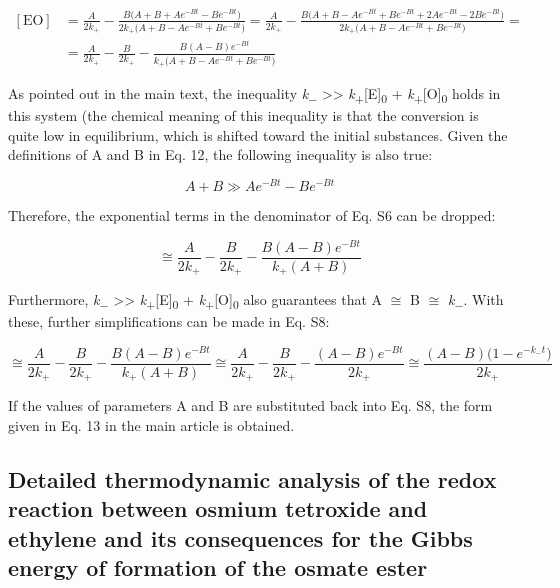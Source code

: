 \documentclass{article}
\begin{document}
\begin{equation}
\begin{split}
[\mathrm{EO}] &= \frac{A}{2k_+} - \frac{B\bigl(A + B + Ae^{-Bt} - Be^{-Bt}\bigr)}{2k_+\bigl(A + B - Ae^{-Bt} + Be^{-Bt}\bigr)} = \frac{A}{2k_+} - \frac{B\bigl(A + B - Ae^{-Bt} + Be^{-Bt} + 2Ae^{-Bt} - 2Be^{-Bt}\bigr)}{2k_+\bigl(A + B - Ae^{-Bt} + Be^{-Bt}\bigr)} =\\[4pt]
&= \frac{A}{2k_+} - \frac{B}{2k_+} - \frac{B(A - B)e^{-Bt}}{k_+\bigl(A + B - Ae^{-Bt} + Be^{-Bt}\bigr)}
\end{split} \tag{S6}
\end{equation}

As pointed out in the main text, the inequality \emph{k}\textsubscript{−} >> \emph{k}\textsubscript{+}[E]\textsubscript{0} + \emph{k}\textsubscript{+}[O]\textsubscript{0} holds in this system (the chemical meaning of this inequality is that the conversion is quite low in equilibrium, which is shifted toward the initial substances. Given the definitions of A and B in Eq. 12, the following inequality is also true:

\begin{equation}
A + B \gg Ae^{-Bt} - Be^{-Bt} \tag{S7}
\end{equation}

Therefore, the exponential terms in the denominator of Eq. S6 can be dropped:

\begin{equation}
[\mathrm{EO}] \cong \frac{A}{2k_+} - \frac{B}{2k_+} - \frac{B(A - B)e^{-Bt}}{k_+(A + B)} \tag{S8}
\end{equation}

Furthermore, \emph{k}\textsubscript{−} >> \emph{k}\textsubscript{+}[E]\textsubscript{0} + \emph{k}\textsubscript{+}[O]\textsubscript{0} also guarantees that A $\cong$ B $\cong$ \emph{k}\textsubscript{−}. With these, further simplifications can be made in Eq. S8:

\begin{equation*}
[\mathrm{EO}] \cong \frac{A}{2k_+} - \frac{B}{2k_+} - \frac{B(A - B)e^{-Bt}}{k_+(A + B)} \cong \frac{A}{2k_+} - \frac{B}{2k_+} - \frac{(A - B)e^{-Bt}}{2k_+} \cong \frac{(A - B)\bigl(1 - e^{-k_-t}\bigr)}{2k_+}
\end{equation*}

If the values of parameters A and B are substituted back into Eq. S8, the form given in Eq. 13 in the main article is obtained.

\subsection*{Detailed thermodynamic analysis of the redox reaction between osmium tetroxide and ethylene and its consequences for the Gibbs energy of formation of the osmate ester}
\end{document}
